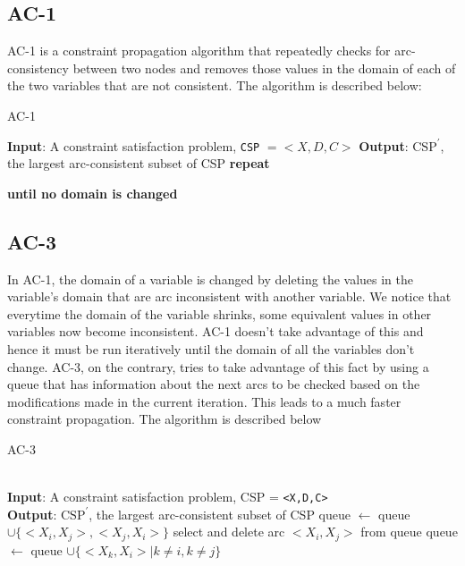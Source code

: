 \subsection{AC-1}
AC-1 is a constraint propagation algorithm that repeatedly checks for arc-consistency between two nodes and removes those values in the domain of each of the two variables that are not consistent. The algorithm is described below:
\begin{algorithm}
  \caption{AC-1}\label{ac1}
  \begin{algorithmic}[1]
    \State \textbf{Input}: A constraint satisfaction problem, \texttt{CSP} $= <X,D,C>$
    \State \textbf{Output}$\text{: CSP}^{'}$, the largest arc-consistent subset of CSP
    \State \textbf{repeat}
    \State {}
    \State {}
    \EndFor
    
    \State\textbf{until no domain is changed}
    \EndProcedure
  \end{algorithmic}
\end{algorithm}
\subsection{AC-3}
In AC-1, the domain of a variable is changed by deleting the values in the variable's domain that are arc inconsistent with another variable. We notice that everytime the domain of the variable shrinks, some equivalent values in other variables now become inconsistent. AC-1 doesn't take advantage of this and hence it must be run iteratively until the domain of all the variables don't change. AC-3, on the contrary, tries to take advantage of this fact by using a queue that has information about the next arcs to be checked based on the modifications made in the current iteration. This leads to a much faster constraint propagation. The algorithm is described below
\begin{algorithm}
  \caption{AC-3}\label{ac3}
  \begin{algorithmic}[1]
    \\
    \textbf{Input}: A constraint satisfaction problem, CSP = \texttt{<X,D,C>}\\
    \textbf{Output}: $\text{CSP}^{'}$, the largest arc-consistent subset of CSP
        \State queue $\gets$ queue $\cup \{<X_{i},X_{j}>,<X_{j},X_{i}>\}$
    \EndFor
    \State select and delete arc $<X_{i},X_{j}>$ from queue
    \State {}
    \State queue $\gets$ queue $\cup\{<X_{k},X_{i}>| k\neq i, k\neq j\}$
    \EndIf
    \EndWhile
    \EndProcedure
  \end{algorithmic}
\end{algorithm}

